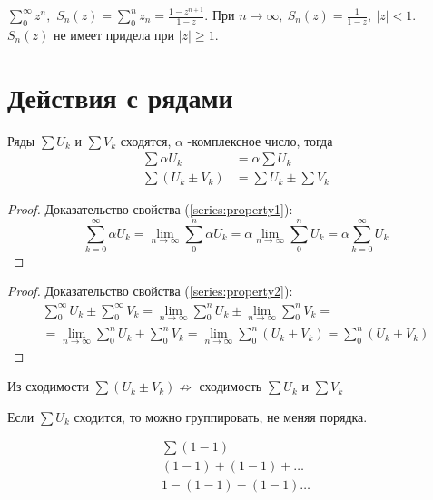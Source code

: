 \begin{example}
  $\sum\limits_0^\infty z^n,$
  $S_n(z) = \sum\limits_0^n z_n = \frac{1-z^{n+1}}{1-z}$.
  При $n \to \infty, \ S_n(z) = \frac{1}{1 - z}, \ |z| < 1$. \\
  $S_n(z)$ не имеет придела при $|z| \geq 1$.
\end{example}

\section{Действия с рядами}

\begin{theorem}
  Ряды $\sum U_k$ и $\sum V_k$ сходятся, $\alpha$ -комплексное число, тогда
  \begin{align}
    \label{series:property1}
    \sum\alpha U_k &= \alpha\sum U_k \\
    \label{series:property2}
    \sum (U_k \pm V_k) &= \sum U_k \pm \sum V_k
  \end{align}
\end{theorem}
\begin{proof}
  Доказательство свойства (\eqref{series:property1}):
  $$\sum\limits_{k=0}^\infty \alpha U_k = \lim\limits_{n \to \infty}
  \sum\limits_0^n \alpha U_k = \alpha \lim\limits_{n \to \infty} \sum\limits_0^n U_k
  = \alpha \sum\limits_{k = 0}^\infty U_k$$
\end{proof}
\begin{proof}
  Доказательство свойства (\eqref{series:property2}):
  \begin{gather*}
      \sum\limits_0^\infty U_k \pm \sum\limits_{0}^{\infty} V_k
      = \lim\limits_{n \to \infty} \sum\limits_{0}^{n} U_k
      \pm \lim\limits_{n \to \infty} \sum\limits_{0}^{n} V_k = \\
      = \lim\limits_{n \to \infty} \sum\limits_{0}^{n} U_k
      \pm \sum\limits_{0}^{n} V_k
      = \lim\limits_{n \to \infty} \sum\limits_{0}^{n} (U_k \pm V_k)
      = \sum\limits_{0}^{n} (U_k \pm V_k)
  \end{gather*}
\end{proof}

\begin{remark}
  Из сходимости $\sum (U_k \pm V_k) \not \Rightarrow$ сходимость
  $\sum U_k$ и $\sum V_k$
\end{remark}
\begin{remark}
  Если $\sum U_k$ сходится, то можно группировать, не меняя порядка.
\end{remark}
\begin{example}
  \begin{gather*}
    \sum (1 - 1) \\
    (1 - 1) + (1 - 1) + \dots \\
    1 - (1 - 1) - (1 - 1) \dots
  \end{gather*}
\end{example}
\begin{comment}
  Нельзя раскрывать скобки и переставлять члены.
\end{comment}

